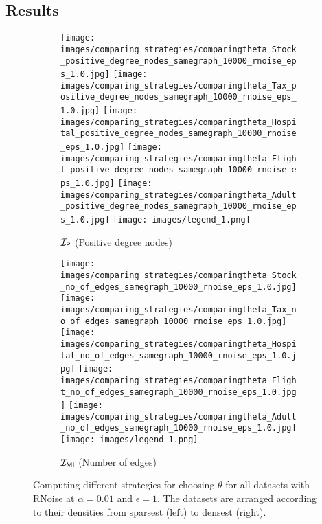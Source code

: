 \subsection{Results}\label{sec:results}



\begin{figure*}
    \begin{subfigure}[b]{\textwidth}
         \centering
         \texttt{[image: images/comparing\_strategies/comparingtheta\_Stock\_positive\_degree\_nodes\_samegraph\_10000\_rnoise\_eps\_1.0.jpg]}
         \hfill
         \texttt{[image: images/comparing\_strategies/comparingtheta\_Tax\_positive\_degree\_nodes\_samegraph\_10000\_rnoise\_eps\_1.0.jpg]}
         \hfill
         \texttt{[image: images/comparing\_strategies/comparingtheta\_Hospital\_positive\_degree\_nodes\_samegraph\_10000\_rnoise\_eps\_1.0.jpg]}
         \hfill
         \texttt{[image: images/comparing\_strategies/comparingtheta\_Flight\_positive\_degree\_nodes\_samegraph\_10000\_rnoise\_eps\_1.0.jpg]}
        \hfill
         \texttt{[image: images/comparing\_strategies/comparingtheta\_Adult\_positive\_degree\_nodes\_samegraph\_10000\_rnoise\_eps\_1.0.jpg]}
        \texttt{[image: images/legend\_1.png]}
         \caption{$\mathcal{I_\mathsf{P}}$ (Positive degree nodes)}
         \label{fig:comparing_strategies_pdnodes}
     \end{subfigure}
     \begin{subfigure}[b]{\textwidth}
         \centering
         \texttt{[image: images/comparing\_strategies/comparingtheta\_Stock\_no\_of\_edges\_samegraph\_10000\_rnoise\_eps\_1.0.jpg]}
         \hfill
         \texttt{[image: images/comparing\_strategies/comparingtheta\_Tax\_no\_of\_edges\_samegraph\_10000\_rnoise\_eps\_1.0.jpg]}
         \hfill
         \texttt{[image: images/comparing\_strategies/comparingtheta\_Hospital\_no\_of\_edges\_samegraph\_10000\_rnoise\_eps\_1.0.jpg]}
         \hfill
         \texttt{[image: images/comparing\_strategies/comparingtheta\_Flight\_no\_of\_edges\_samegraph\_10000\_rnoise\_eps\_1.0.jpg]}
        \hfill
         \texttt{[image: images/comparing\_strategies/comparingtheta\_Adult\_no\_of\_edges\_samegraph\_10000\_rnoise\_eps\_1.0.jpg]}
        \texttt{[image: images/legend\_1.png]}
         \caption{$\mathcal{I_{\mathsf{MI}}}$ (Number of edges)}
         \label{fig:comparing_strategies_nedges}
     \end{subfigure}
     \caption{Computing different strategies for choosing $\theta$ for all datasets with RNoise at $\alpha=0.01$ and $\epsilon=1$. The datasets are arranged according to their densities from sparsest (left) to densest (right). }
     \label{fig:comparing_strategies}
\end{figure*}


